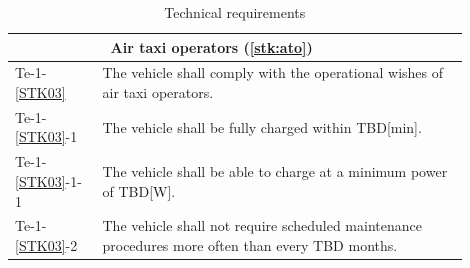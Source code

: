     \begin{longtable}{m{0.16\linewidth}m{0.74\linewidth}}
    \caption{Technical requirements}
    \label{tab:technicalreq}
        \\\hline &~\textbf{Air taxi operators (\ref{stk:ato})} \\\hline
        Te-1-\ref{STK03} & The vehicle shall comply with the operational wishes of air taxi operators. \\
            Te-1-\ref{STK03}-1 & The vehicle shall be fully charged within TBD[min].\\
                \cellcolor[HTML]{9AFF99}Te-1-\ref{STK03}-1-1& \cellcolor[HTML]{9AFF99}The vehicle shall be able to charge at a minimum power of TBD[W].\\
            Te-1-\ref{STK03}-2 & The vehicle shall not require scheduled maintenance procedures more often than every TBD months. \\
            
            


\end{longtable}
